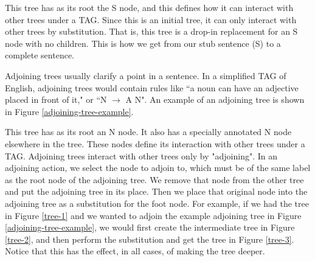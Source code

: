 This tree has as its root the S node, and this defines how it can interact with other
trees under a TAG.  Since this is an initial tree, it can only interact with other trees by
substitution.  That is, this tree is a drop-in replacement for an S node with no children.
This is how we get from our stub sentence (S) to a complete sentence.

Adjoining trees usually clarify a point in a sentence.  In a simplified TAG of English, adjoining
trees would contain rules like ``a noun can have an adjective placed in front of it," or ``N $\rightarrow$ A N".
An example of an adjoining tree is shown in Figure \ref{adjoining-tree-example}.

This tree has as its root an N node.  It also has a specially annotated N node elsewhere in the
tree.  These nodes define its interaction with other trees under a TAG.  Adjoining trees interact
with other trees only by "adjoining".  In an adjoining action, we select the node
to adjoin to, which must be of the same label as the root node of the adjoining tree.  We remove
that node from the other tree and put the adjoining tree in its place.  Then
we place that original node into the adjoining tree as a substitution for the foot node.
For example, if we had the tree in Figure \ref{tree-1} and we wanted to adjoin the example adjoining tree
in Figure \ref{adjoining-tree-example}, we would first create the intermediate tree in Figure \ref{tree-2},
and then perform the substitution and get the tree in Figure \ref{tree-3}.  Notice that this has the effect,
in all cases, of making the tree deeper.

